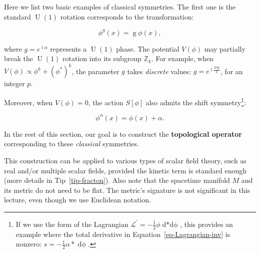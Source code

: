 \documentclass[
  letterpaper,
  DIV=11,
  numbers=noendperiod]{scrreport}
\DeclareMathOperator{\U}{U}
\DeclareMathOperator{\imunit}{i}
\begin{document}
Here we list two basic examples of classical symmetries. The first one
is the standard \(\U(1)\) rotation corresponds to the transformation:

\[
\phi^g(x) = \mathop{g} \phi(x),
\]

where \(g=e^{\imunit \alpha}\) represents a \(\U(1)\) phase. The
potential \(V(\phi)\) may partially break the \(\U(1)\) rotation into
its subgroup \(\mathbb{Z}_k\). For example, when
\(V(\phi)\propto \phi^k+(\phi^*)^k\), the parameter \(g\) takes
\emph{discrete} values: \(g = e^{\imunit \frac{2\pi p}{k}}\), for an
integer \(p\).

Moreover, when \(V(\phi)=0\), the action \(S[\phi]\) also admits the
shift symmetry\footnote{If we use the form of the Lagrangian
  \(\mathcal{L}^\prime= -\frac12 \phi \mathop{d*d\phi}\), this provides
  an example where the total derivative in
  Equation~\ref{eq-Lagrangian-inv} is nonzero:
  \(s=-\frac12 \alpha \mathop{*}\mathop{d\phi}\).}:

\[
\phi^{\alpha}(x) = \phi(x) + \alpha.
\]

In the rest of this section, our goal is to construct the
\textbf{topological operator} corresponding to these \emph{classical}
symmetries.

\begin{tcolorbox}[enhanced jigsaw, opacityback=0, opacitybacktitle=0.6, leftrule=.75mm, arc=.35mm, coltitle=black, breakable, colframe=quarto-callout-note-color-frame, titlerule=0mm, colback=white, bottomrule=.15mm, left=2mm, colbacktitle=quarto-callout-note-color!10!white, toptitle=1mm, bottomtitle=1mm, title=\textcolor{quarto-callout-note-color}{\faInfo}\hspace{0.5em}{Note}, rightrule=.15mm, toprule=.15mm]

This construction can be applied to various types of scalar field
theory, such as real and/or multiple scalar fields, provided the kinetic
term is standard enough (more details in Tip~\ref{tip-fracton}). Also
note that the spacetime manifold \(M\) and its metric do not need to be
flat. The metric's signature is not significant in this lecture, even
though we use Euclidean notation.

\end{tcolorbox}
\end{document}
